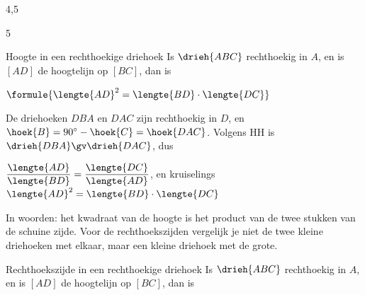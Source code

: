 \begin{alleenvoor}{4,5}
\begin{alleenvoor}{5}
\begin{theorie}
\begin{minipage}[t]{.62\linewidth}
\vspace{0pt}
\begin{stelling}{Hoogte in een rechthoekige driehoek}
Is $\drieh{ABC}$ rechthoekig in $A$, en is $[AD]$ de hoogtelijn op $[BC]$, dan is

\vspace{1mm}
\qquad $\formule{\lengte{AD}^2 = \lengte{BD} \cdot \lengte{DC}}$
\end{stelling}

\begin{bewijs}
De driehoeken $DBA$ en $DAC$ zijn rechthoekig in $D$, en $\hoek{B} = 90^\circ - \hoek{C} = \hoek{DAC}$. Volgens HH is $\drieh{DBA} \gv \drieh{DAC}$, dus

\vspace{1mm}
\qquad $\dfrac{\lengte{AD}}{\lengte{BD}} = \dfrac{\lengte{DC}}{\lengte{AD}}$, \quad en kruiselings $\lengte{AD}^2 = \lengte{BD} \cdot \lengte{DC}$
\end{bewijs}
\end{minipage}\hfill
\begin{minipage}[t]{.34\linewidth}
\vspace{0pt}
\centering
{}
\end{minipage}
\end{theorie}

In woorden: het kwadraat van de hoogte is het product van de twee stukken van de schuine zijde. Voor de rechthoekszijden vergelijk je niet de twee kleine driehoeken met elkaar, maar een kleine driehoek met de grote.

\begin{theorie}
\begin{minipage}[t]{.62\linewidth}
\vspace{0pt}
\begin{stelling}{Rechthoekszijde in een rechthoekige driehoek}
Is $\drieh{ABC}$ rechthoekig in $A$, en is $[AD]$ de hoogtelijn op $[BC]$, dan is


\end{stelling}
\end{minipage}
\end{theorie}
\end{alleenvoor}
\end{alleenvoor}
